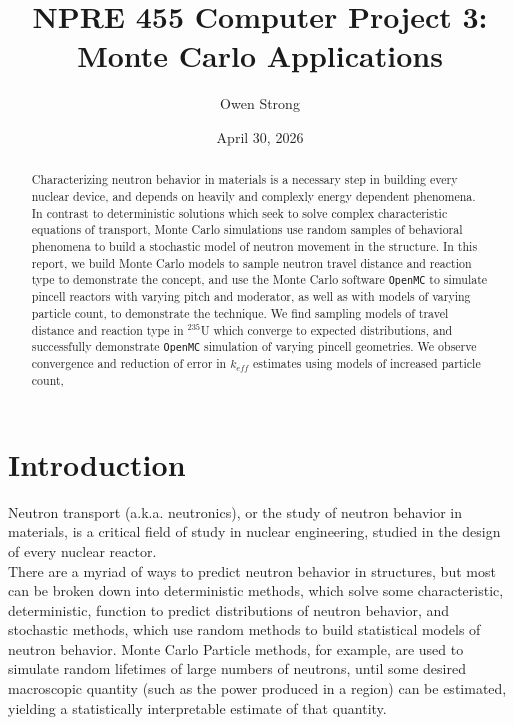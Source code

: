 \documentclass[11pt]{article} %
\title{NPRE 455 Computer Project 3: Monte Carlo Applications}
\author{Owen Strong}
\date{April 30, 2026}
\begin{document}
\maketitle
\clearpage

\tableofcontents
\clearpage

\listoffigures
\listoftables
\clearpage
{}

\begin{abstract}
    Characterizing neutron behavior in materials is a necessary step in building every nuclear device, and depends on heavily and complexly energy dependent phenomena.
    In contrast to deterministic solutions which seek to solve complex characteristic equations of transport, Monte Carlo simulations use random samples of behavioral phenomena to build a stochastic model of neutron movement in the structure.
    In this report, we build Monte Carlo models to sample neutron travel distance and reaction type to demonstrate the concept, and use the Monte Carlo software \texttt{OpenMC} to simulate pincell reactors with varying pitch and moderator, as well as with models of varying particle count, to demonstrate the technique.
    We find sampling models of travel distance and reaction type in $^{235}$U which converge to expected distributions, and successfully demonstrate \texttt{OpenMC} simulation of varying pincell geometries.
    We observe convergence and reduction of error in $k_{eff}$ estimates using models of increased particle count,
\end{abstract}

\section{Introduction}\label{sec:introduction}

Neutron transport (a.k.a. neutronics), or the study of neutron behavior in materials, is a critical field of study in nuclear engineering, studied in the design of every nuclear reactor.\\

There are a myriad of ways to predict neutron behavior in structures, but most can be broken down into deterministic methods, which solve some characteristic, deterministic, function to predict distributions of neutron behavior, and stochastic methods, which use random methods to build statistical models of neutron behavior.
Monte Carlo Particle methods, for example, are used to simulate random lifetimes of large numbers of neutrons, until some desired macroscopic quantity (such as the power produced in a region) can be estimated, yielding a statistically interpretable estimate of that quantity.\\
\end{document}
